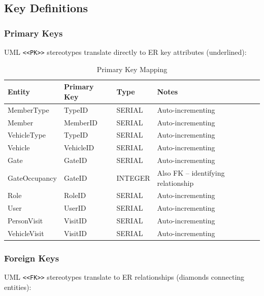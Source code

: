 \documentclass[a4paper, 12pt]{article}
\begin{document}
\subsection{Key Definitions}

\subsubsection{Primary Keys}

UML \texttt{<<PK>>} stereotypes translate directly to ER key attributes (underlined):

\begin{table}[H]
\centering
\caption{Primary Key Mapping}
\label{tab:pk-mapping}
\begin{tabularx}{\textwidth}{l l l X}
\toprule
\textbf{Entity} & \textbf{Primary Key} & \textbf{Type} & \textbf{Notes} \\
\midrule
MemberType & TypeID & SERIAL & Auto-incrementing \\
Member & MemberID & SERIAL & Auto-incrementing \\
VehicleType & TypeID & SERIAL & Auto-incrementing \\
Vehicle & VehicleID & SERIAL & Auto-incrementing \\
Gate & GateID & SERIAL & Auto-incrementing \\
GateOccupancy & GateID & INTEGER & Also FK -- identifying relationship \\
Role & RoleID & SERIAL & Auto-incrementing \\
User & UserID & SERIAL & Auto-incrementing \\
PersonVisit & VisitID & SERIAL & Auto-incrementing \\
VehicleVisit & VisitID & SERIAL & Auto-incrementing \\
\bottomrule
\end{tabularx}
\end{table}

\subsubsection{Foreign Keys}

UML \texttt{<<FK>>} stereotypes translate to ER relationships (diamonds connecting entities):
\end{document}
